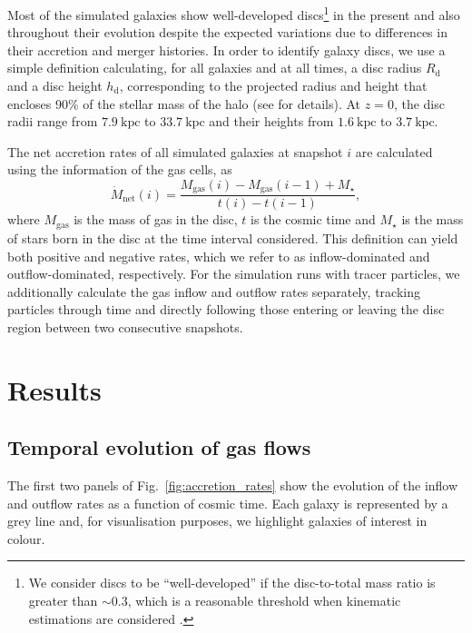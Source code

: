 \documentclass[baaa]{baaa}
\begin{document}
Most of the simulated galaxies show well-developed discs\footnote{We consider discs to be ``well-developed'' if the disc-to-total mass ratio is greater than $\sim 0.3$, which is a reasonable threshold when kinematic estimations are considered \citep{Scannapieco2010}.} in the present and also throughout their evolution despite the expected variations due to differences in their accretion and merger histories.
In order to identify galaxy discs, we use a simple definition calculating, for all galaxies and at all times, a disc radius $R_\mathrm{d}$ and a disc height $h_\mathrm{d}$, corresponding to the projected radius and height that encloses 90\% of the stellar mass of the halo (see \citealt{Iza2022} for details).
At $z=0$, the disc radii range from $7.9~\mathrm{kpc}$ to $33.7~\mathrm{kpc}$ and their heights from $1.6~\mathrm{kpc}$ to $3.7~\mathrm{kpc}$.

The net accretion rates of all simulated galaxies at snapshot $i$ are calculated using the information of the gas cells, as
\begin{equation*} \dot{M}_\mathrm{net}(i) = \frac{M_\mathrm{gas}(i) - M_\mathrm{gas}(i-1) + M_\star}{t(i) - t(i-1)}, \end{equation*}
where $M_\mathrm{gas}$ is the mass of gas in the disc, $t$ is the cosmic time and $M_\star$ is the mass of stars born in the disc at the time interval considered.
This definition can yield both positive and negative rates, which we refer to as inflow-dominated and outflow-dominated, respectively.
For the simulation runs with tracer particles, we additionally calculate the gas inflow and outflow rates separately, tracking particles through time and directly following those entering or leaving the disc region between two consecutive snapshots.

\section{Results}
\label{sec:results}

\subsection{Temporal evolution of gas flows}
\label{sec:results-temporal_evolution}

The first two panels of Fig.~\ref{fig:accretion_rates} show the evolution of the inflow and outflow rates as a function of cosmic time.
Each galaxy is represented by a grey line and, for visualisation purposes, we highlight galaxies of interest in colour.
\end{document}
